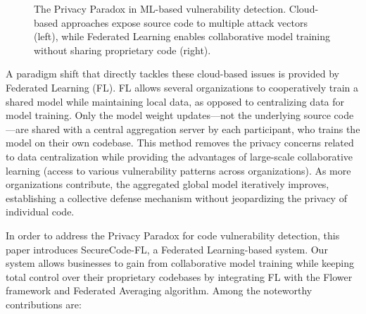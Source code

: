 \documentclass[pdflatex,sn-mathphys-num]{sn-jnl}
\theoremstyle{thmstyleone}%
\theoremstyle{thmstyletwo}%
\theoremstyle{thmstylethree}%
\begin{document}
\begin{figure}[h]
{%
}
\caption{The Privacy Paradox in ML-based vulnerability detection. Cloud-based approaches expose source code to multiple attack vectors (left), while Federated Learning enables collaborative model training without sharing proprietary code (right).}
\label{fig:privacy_paradox}
\end{figure}

\FloatBarrier


A paradigm shift that directly tackles these cloud-based issues is provided by Federated Learning (FL). FL allows several organizations to cooperatively train a shared model while maintaining local data, as opposed to centralizing data for model training. Only the model weight updates—not the underlying source code—are shared with a central aggregation server by each participant, who trains the model on their own codebase. This method removes the privacy concerns related to data centralization while providing the advantages of large-scale collaborative learning (access to various vulnerability patterns across organizations). As more organizations contribute, the aggregated global model iteratively improves, establishing a collective defense mechanism without jeopardizing the privacy of individual code.

In order to address the Privacy Paradox for code vulnerability detection, this paper introduces SecureCode-FL, a Federated Learning-based system. Our system allows businesses to gain from collaborative model training while keeping total control over their proprietary codebases by integrating FL with the Flower framework and Federated Averaging algorithm. Among the noteworthy contributions are:
\end{document}
